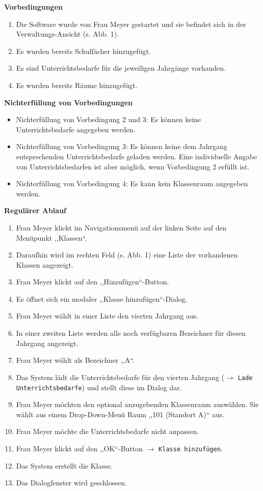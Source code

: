 \documentclass[fontsize=12pt,paper=a4,twoside]{scrartcl}
\begin{document}
\textbf{Vorbedingungen}
\begin{enumerate}
\item Die Software wurde von Frau Meyer gestartet und sie befindet sich in der Verwaltungs-Ansicht (s. Abb. 1).
\item Es wurden bereits Schulfächer hinzugefügt.
\item Es sind Unterrichtsbedarfe für die jeweiligen Jahrgänge vorhanden.
\item Es wurden bereits Räume hinzugefügt.
\end{enumerate}
\vspace{5pt}


\textbf{Nichterfüllung von Vorbedingungen}
\begin{itemize}
\item Nichterfüllung von Vorbedingung 2 und 3: Es können keine Unterrichtsbedarfe angegeben werden.
\item Nichterfüllung von Vorbedingung 3: Es können keine dem Jahrgang entsprechenden Unterrichtsbedarfe geladen werden. Eine individuelle Angabe von Unterrichtsbedarfen ist aber möglich, wenn Vorbedingung 2 erfüllt ist.
\item Nichterfüllung von Vorbedingung 4: Es kann kein Klassenraum angegeben werden.
\end{itemize}
\vspace{5pt}

\textbf{Regulärer Ablauf}
\begin{enumerate}
\item Frau Meyer klickt im Navigationsmenü auf der linken Seite auf den Menüpunkt ,,Klassen``.
\item Daraufhin wird im rechten Feld (s. Abb. 1) eine Liste der vorhandenen Klassen angezeigt.
\item Frau Meyer klickt auf den ,,Hinzuf\"ugen``-Button.
\item Es öffnet sich ein modaler ,,Klasse hinzufügen``-Dialog.
\item Frau Meyer wählt in einer Liste den vierten Jahrgang aus. 
\item In einer zweiten Liste werden alle noch verfügbaren Bezeichner für diesen Jahrgang angezeigt.
\item Frau Meyer wählt als Bezeichner ,,A``.
\item Das System lädt die  Unterrichtsbedarfe für den vierten Jahrgang ($\rightarrow$ \texttt{Lade Unterrichtsbedarfe}) und stellt diese im Dialog dar.
\item Frau Meyer möchten den optional anzugebenden Klassenraum auswählen. Sie wählt aus einem Drop-Down-Menü Raum ,,101 (Standort A)`` aus.
\item Frau Meyer möchte die Unterrichtsbedarfe nicht anpassen.
\item Frau Meyer klickt auf den ,,OK``-Button $\rightarrow$ \texttt{Klasse hinzufügen}.
\item Das System erstellt die Klasse. 
\item Das Dialogfenster wird geschlossen.
\end{enumerate}
\vspace{5pt}
\end{document}
